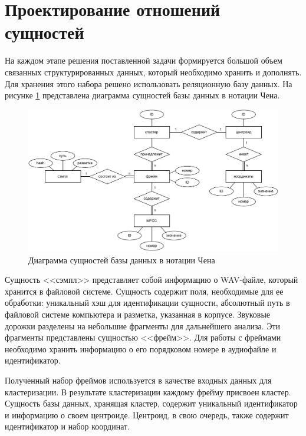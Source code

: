 \section{Проектирование отношений сущностей}
На каждом этапе  решения поставленной задачи формируется большой объем связанных структурированных данных, который необходимо хранить и дополнять. Для хранения этого набора решено использовать реляционную базу данных. На рисунке \ref{fig:chen} представлена диаграмма сущностей базы данных в нотации Чена.
\begin{figure}[H]
	\centering
	\includegraphics[width=\linewidth]{assets/chen}
	\caption{Диаграмма сущностей базы данных в нотации Чена}
	\label{fig:chen}
\end{figure} 
Сущность <<сэмпл>> представляет собой информацию о WAV-файле, который хранится в файловой системе. Сущность содержит поля, необходимые для ее обработки: уникальный хэш для идентификации сущности, абсолютный путь в файловой системе компьютера и разметка, указанная в корпусе. Звуковые дорожки разделены на небольшие фрагменты для дальнейшего анализа. Эти фрагменты представлены сущностью <<фрейм>>. Для работы с фреймами необходимо хранить информацию о его порядковом номере в аудиофайле и идентификатор. 

Полученный набор фреймов используется в качестве входных данных для кластеризации. В результате кластеризации каждому фрейму присвоен кластер. Сущность базы данных, хранящая кластер, содержит уникальный идентификатор и информацию о своем центроиде. Центроид, в свою очередь, также содержит идентификатор и набор координат.